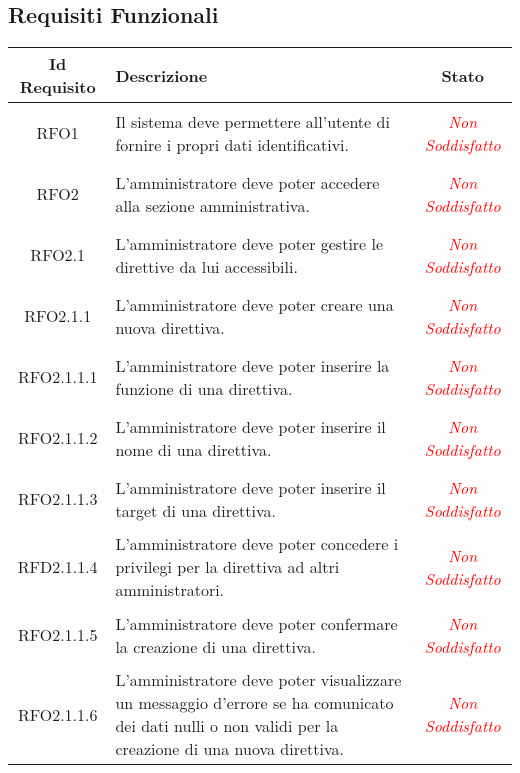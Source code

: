 \subsection{Requisiti Funzionali}
\normalsize
\begin{longtable}{|c|>{\centering}m{7cm}|c|}
\hline 
\textbf{Id Requisito} & \textbf{Descrizione} & \textbf{Stato}\\
\hline
\endhead
\hypertarget{RFO1}{RFO1} & Il sistema deve permettere all'utente di fornire i propri dati identificativi. & \textcolor{Red}{\textit{Non Soddisfatto}}\\ \hline

\hypertarget{RFO2}{RFO2} & L'amministratore deve poter accedere alla sezione amministrativa. & \textcolor{Red}{\textit{Non Soddisfatto}}\\ \hline

\hypertarget{RFO2.1}{RFO2.1} & L'amministratore deve poter gestire le direttive da lui accessibili. & \textcolor{Red}{\textit{Non Soddisfatto}}\\ \hline

\hypertarget{RFO2.1.1}{RFO2.1.1} & L'amministratore deve poter creare una nuova direttiva. & \textcolor{Red}{\textit{Non Soddisfatto}}\\ \hline

\hypertarget{RFO2.1.1.1}{RFO2.1.1.1} & L'amministratore deve poter inserire la funzione di una direttiva. & \textcolor{Red}{\textit{Non Soddisfatto}}\\ \hline

\hypertarget{RFO2.1.1.2}{RFO2.1.1.2} & L'amministratore deve poter inserire il nome di una direttiva. & \textcolor{Red}{\textit{Non Soddisfatto}}\\ \hline

\hypertarget{RFO2.1.1.3}{RFO2.1.1.3} & L'amministratore deve poter inserire il target di una direttiva. & \textcolor{Red}{\textit{Non Soddisfatto}}\\ \hline

\hypertarget{RFD2.1.1.4}{RFD2.1.1.4} & L'amministratore deve poter concedere i privilegi per la direttiva ad altri amministratori. & \textcolor{Red}{\textit{Non Soddisfatto}}\\ \hline

\hypertarget{RFO2.1.1.5}{RFO2.1.1.5} & L'amministratore deve poter confermare la creazione di una direttiva. & \textcolor{Red}{\textit{Non Soddisfatto}}\\ \hline

\hypertarget{RFO2.1.1.6}{RFO2.1.1.6} & L'amministratore deve poter visualizzare un messaggio d'errore se ha comunicato dei dati nulli o non validi per la creazione di una nuova direttiva. & \textcolor{Red}{\textit{Non Soddisfatto}}\\ \hline


\end{longtable}
